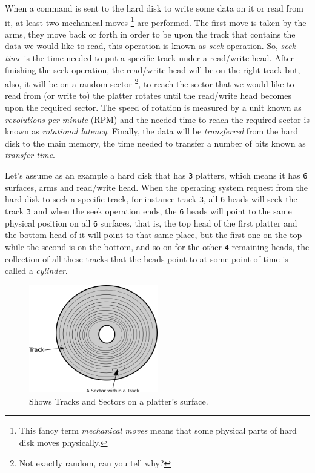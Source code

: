 When a command is sent to the hard disk to write some data on it or read
from it, at least two mechanical moves \footnote{This fancy term
  \emph{mechanical moves} means that some physical parts of hard disk
  moves physically.} are performed. The first move is taken by the arms,
they move back or forth in order to be upon the track that contains the
data we would like to read, this operation is known as \emph{seek}
operation. So, \emph{seek time} is the time needed to put a specific
track under a read/write head. After finishing the seek operation, the
read/write head will be on the right track but, also, it will be on a
random sector \footnote{Not exactly random, can you tell why?}, to reach
the sector that we would like to read from (or write to) the platter
rotates until the read/write head becomes upon the required sector. The
speed of rotation is measured by a unit known as \emph{revolutions per
minute} (RPM) and the needed time to reach the required sector is known
as \emph{rotational latency}. Finally, the data will be
\emph{transferred} from the hard disk to the main memory, the time
needed to transfer a number of bits known as \emph{transfer time}.

Let's assume as an example a hard disk that has \lstinline!3! platters,
which means it has \lstinline!6! surfaces, arms and read/write head.
When the operating system request from the hard disk to seek a specific
track, for instance track \lstinline!3!, all \lstinline!6! heads will
seek the track \lstinline!3! and when the seek operation ends, the
\lstinline!6! heads will point to the same physical position on all
\lstinline!6! surfaces, that is, the top head of the first platter and
the bottom head of it will point to that same place, but the first one
on the top while the second is on the bottom, and so on for the other
\lstinline!4! remaining heads, the collection of all these tracks that
the heads point to at some point of time is called a \emph{cylinder}.

\begin{figure}
\centering
\includegraphics[width=0.50000\textwidth]{Figures/bootloader-ch/tracks-sectors.png}
\caption{Shows Tracks and Sectors on a platter's
surface.}\label{fig:tracks-sectors}
\end{figure}

